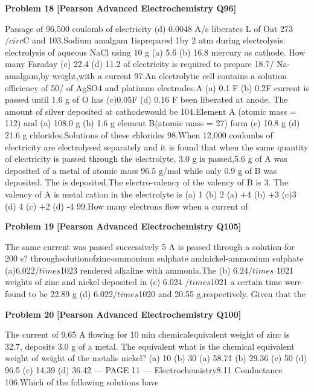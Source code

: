 \begin{problembox}
\textbf{Problem 18} \hfill \textbf{[Pearson Advanced Electrochemistry Q96]}
\label{q:ext-pearson-18}

Passage of 96,500 coulomb of electricity
(d) 0.0048 A/s
liberates
L of Oat 273$/circ$C and
103.Sodium
amalgam
1isprepared
1by
2 atm during electrolysis.
electrolysis of aqueous NaCl using 10 g
(a) 5.6
(b) 16.8
mercury as cathode. How many Faraday
(c) 22.4
(d) 11.2
of electricity is required to prepare 18.7/%
Na-amalgam,by weight,with a current
97.An electrolytic cell contains a solution
efficiency of 50/%
of AgSO4 and platinum electrodes.A
(a) 0.1 F
(b) 0.2F
current is passed until 1.6 g of O has
(c)0.05F
(d) 0.16 F
been liberated at anode. The amount of
silver deposited at cathodewould be
104.Element A (atomic mass = 112) and
(a) 108.0 g
(b) 1.6 g
element B(atomic mass = 27) form
(c) 10.8 g
(d) 21.6 g
chlorides.Solutions of these chlorides
98.When 12,000 coulombs of electricity
are electrolysed separately and it is found
that when the same quantity of electricity
is passed through the electrolyte, 3.0 g
is passed,5.6 g of A was deposited
of a metal of atomic mass 96.5 g/mol
while only 0.9 g of B was deposited. The
is deposited.The electro-valency of the
valency of B is 3. The valency of A is
metal cation in the electrolyte is
(a) 1
(b) 2
(a) +4
(b) +3
(c)3
(d) 4
(c) +2
(d) -4
99.How many electrons flow when a current of
\end{problembox}

\begin{problembox}
\textbf{Problem 19} \hfill \textbf{[Pearson Advanced Electrochemistry Q105]}
\label{q:ext-pearson-19}

The same current was passed successively
5 A is passed through a solution for 200 s?
throughsolutionofzinc-ammonium
sulphate andnickel-ammonium sulphate
(a)6.022$/times$1023
rendered alkaline with ammonia.The
(b) 6.24$/times$ 1021
weights of zinc and nickel deposited in
(c) 6.024 $/times$1021
a certain time were found to be 22.89 g
(d) 6.022$/times$1020
and 20.55 g,respectively. Given that the
\end{problembox}

\begin{problembox}
\textbf{Problem 20} \hfill \textbf{[Pearson Advanced Electrochemistry Q100]}
\label{q:ext-pearson-20}

The current of 9.65 A flowing for 10 min
chemicalequivalent weight of zinc is 32.7,
deposits 3.0 g of a metal. The equivalent
what is the chemical equivalent weight of
weight of the metalis
nickel?
(a) 10
(b) 30
(a) 58.71
(b) 29.36
(c) 50
(d) 96.5
(c) 14.39
(d) 36.42
--- PAGE 11 ---
Electrochemistry8.11
Conductance
106.Which of the following solutions have
\end{problembox}

